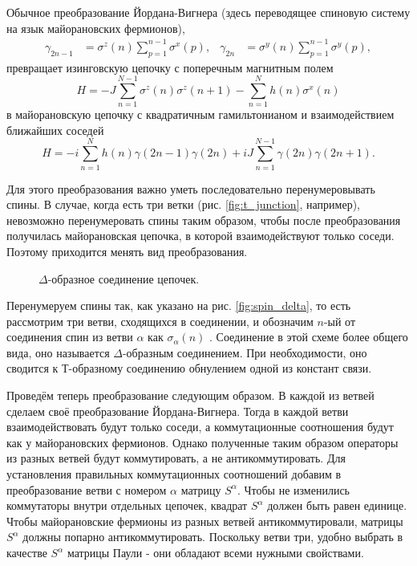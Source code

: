 \documentclass[a4paper,12pt]{article}
\theoremstyle{plain} %
\theoremstyle{definition} %
\theoremstyle{remark} %
\begin{document}
Обычное преобразование Йордана-Вигнера (здесь переводящее спиновую систему на язык майорановских фермионов),
\begin{align}
\gamma_{2n-1} &= \sigma^z (n) \sum\limits_{p=1}^{n-1} \sigma^x (p), & 
\gamma_{2n} &= \sigma^y (n) \sum\limits_{p=1}^{n-1} \sigma^y (p),
\end{align}
превращает изинговскую цепочку с поперечным магнитным полем
\begin{equation}
H = - J \sum\limits_{n=1}^{N-1} \sigma^z(n) \sigma^z(n+1) - \sum\limits_{n=1}^N h(n) \sigma^x(n)
\label{eq:spin_H}
\end{equation}
в майорановскую цепочку с квадратичным гамильтонианом и взаимодействием ближайших соседей
\begin{equation}
H = -i \sum\limits_{n=1}^N h(n) \gamma(2n-1) \gamma(2n) + i J \sum\limits_{n=1}^{N-1} \gamma(2n) \gamma(2n+1).
\end{equation}

Для этого преобразования важно уметь последовательно перенумеровывать спины. В случае, когда есть три ветки (рис. \ref{fig:t_junction}, например), невозможно перенумеровать спины таким образом, чтобы после преобразования получилась майорановская цепочка, в которой взаимодействуют только соседи. Поэтому приходится менять вид преобразования.

\begin{figure}
    \centering
    \captionsetup{width=0.45\textwidth}
    \caption{$\Delta$-образное соединение цепочек.}
\end{figure}

Перенумеруем спины так, как указано на рис. \ref{fig:spin_delta}, то есть рассмотрим три ветви, сходящихся в соединении, и обозначим $n$-ый от соединения спин из ветви $\alpha$ как $\sigma_\alpha (n)$ . Соединение в этой схеме более общего вида, оно называется $\Delta$-образным соединением. При необходимости, оно сводится к Т-образному соединению обнулением одной из констант связи.

Проведём теперь преобразование следующим образом. В каждой из ветвей сделаем своё преобразование Йордана-Вигнера. Тогда в каждой ветви взаимодействовать будут только соседи, а коммутационные соотношения будут как у майорановских фермионов. Однако полученные таким образом операторы из разных ветвей будут коммутировать, а не антикоммутировать. Для установления правильных коммутационных соотношений добавим в преобразование ветви с номером $\alpha$ матрицу $S^\alpha$. Чтобы не изменились коммутаторы внутри отдельных цепочек, квадрат $S^\alpha$ должен быть равен единице. Чтобы майорановские фермионы из разных ветвей антикоммутировали, матрицы $S^\alpha$ должны попарно антикоммутировать. Поскольку ветви три, удобно выбрать в качестве $S^\alpha$ матрицы Паули - они обладают всеми нужными свойствами.
\end{document}
